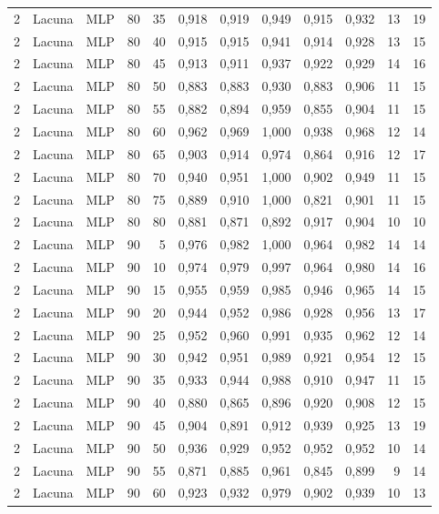 \begin{longtable}{ccclrrrrrrrr}
2 & Lacuna & MLP & 80 & 35 & 0,918 & 0,919 & 0,949 & 0,915 & 0,932 & 13 & 19 \\
2 & Lacuna & MLP & 80 & 40 & 0,915 & 0,915 & 0,941 & 0,914 & 0,928 & 13 & 15 \\
2 & Lacuna & MLP & 80 & 45 & 0,913 & 0,911 & 0,937 & 0,922 & 0,929 & 14 & 16 \\
2 & Lacuna & MLP & 80 & 50 & 0,883 & 0,883 & 0,930 & 0,883 & 0,906 & 11 & 15 \\
2 & Lacuna & MLP & 80 & 55 & 0,882 & 0,894 & 0,959 & 0,855 & 0,904 & 11 & 15 \\
2 & Lacuna & MLP & 80 & 60 & 0,962 & 0,969 & 1,000 & 0,938 & 0,968 & 12 & 14 \\
2 & Lacuna & MLP & 80 & 65 & 0,903 & 0,914 & 0,974 & 0,864 & 0,916 & 12 & 17 \\
2 & Lacuna & MLP & 80 & 70 & 0,940 & 0,951 & 1,000 & 0,902 & 0,949 & 11 & 15 \\
2 & Lacuna & MLP & 80 & 75 & 0,889 & 0,910 & 1,000 & 0,821 & 0,901 & 11 & 15 \\
2 & Lacuna & MLP & 80 & 80 & 0,881 & 0,871 & 0,892 & 0,917 & 0,904 & 10 & 10 \\
2 & Lacuna & MLP & 90 & 5 & 0,976 & 0,982 & 1,000 & 0,964 & 0,982 & 14 & 14 \\
2 & Lacuna & MLP & 90 & 10 & 0,974 & 0,979 & 0,997 & 0,964 & 0,980 & 14 & 16 \\
2 & Lacuna & MLP & 90 & 15 & 0,955 & 0,959 & 0,985 & 0,946 & 0,965 & 14 & 15 \\
2 & Lacuna & MLP & 90 & 20 & 0,944 & 0,952 & 0,986 & 0,928 & 0,956 & 13 & 17 \\
2 & Lacuna & MLP & 90 & 25 & 0,952 & 0,960 & 0,991 & 0,935 & 0,962 & 12 & 14 \\
2 & Lacuna & MLP & 90 & 30 & 0,942 & 0,951 & 0,989 & 0,921 & 0,954 & 12 & 15 \\
2 & Lacuna & MLP & 90 & 35 & 0,933 & 0,944 & 0,988 & 0,910 & 0,947 & 11 & 15 \\
2 & Lacuna & MLP & 90 & 40 & 0,880 & 0,865 & 0,896 & 0,920 & 0,908 & 12 & 15 \\
2 & Lacuna & MLP & 90 & 45 & 0,904 & 0,891 & 0,912 & 0,939 & 0,925 & 13 & 19 \\
2 & Lacuna & MLP & 90 & 50 & 0,936 & 0,929 & 0,952 & 0,952 & 0,952 & 10 & 14 \\
2 & Lacuna & MLP & 90 & 55 & 0,871 & 0,885 & 0,961 & 0,845 & 0,899 & 9 & 14 \\
2 & Lacuna & MLP & 90 & 60 & 0,923 & 0,932 & 0,979 & 0,902 & 0,939 & 10 & 13 \\

\end{longtable}
